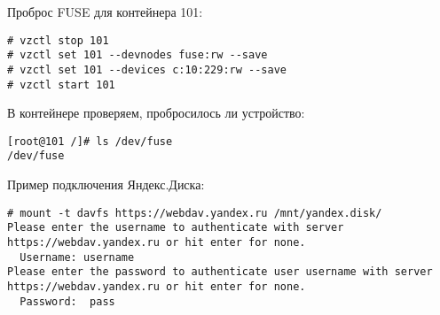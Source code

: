 Проброс FUSE для контейнера 101:
\begin{lstlisting}
# vzctl stop 101
# vzctl set 101 --devnodes fuse:rw --save
# vzctl set 101 --devices c:10:229:rw --save
# vzctl start 101
\end{lstlisting}

В контейнере проверяем, пробросилось ли устройство:
\begin{lstlisting}
[root@101 /]# ls /dev/fuse
/dev/fuse
\end{lstlisting}

Пример подключения Яндекс.Диска:
\begin{lstlisting}
# mount -t davfs https://webdav.yandex.ru /mnt/yandex.disk/
Please enter the username to authenticate with server
https://webdav.yandex.ru or hit enter for none.
  Username: username
Please enter the password to authenticate user username with server
https://webdav.yandex.ru or hit enter for none.
  Password:  pass
\end{lstlisting}

\clearpage
